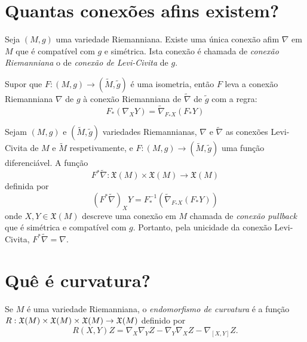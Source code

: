 \section{Quantas conexões afins existem?}

\begin{teorema}
	Seja $(M,g)$ uma variedade Riemanniana. Existe uma única conexão afim $\nabla$ em $M$ que é compatível com $g$ e simétrica.
	Ista conexão é chamada de \emph{conexão Riemanniana} o de \emph{conexão de Levi-Civita} de $g$.
\end{teorema}

\begin{proposicao}
	Supor que $F: (M,g) \rightarrow (\tilde{M}, \tilde{g})$ é uma isometria, então $F$ leva a conexão Riemanniana $\nabla$ de $g$ à conexão Riemanniana de $\tilde{\nabla}$ de $\tilde{g}$ com a regra:
	\begin{equation*}
		F_* (\nabla_X Y) = \tilde{\nabla}_{F_* X} (F_* Y)
	\end{equation*}
\end{proposicao}

\begin{observacao}
	Sejam $(M,g)$ e $(\tilde{M}, \tilde{g})$ variedades Riemannianas, $\nabla$ e $\tilde{\nabla}$ as conexões Levi-Civita de $M$ e $\tilde{M}$ respetivamente, e $F: (M,g) \rightarrow (\tilde{M},\tilde{g})$ uma função diferenciável. A função
	\begin{equation*}
		F^* \tilde{\nabla}: \mathfrak{X}(M) \times \mathfrak{X}(M) \rightarrow \mathfrak{X}(M)
	\end{equation*}
	definida por
	\begin{equation*}
		\left( F^* \tilde{\nabla} \right)_X Y = F^{-1}_* \left( \tilde{\nabla}_{F_* X} (F_* Y) \right)
	\end{equation*}
	onde $X,Y \in \mathfrak{X}(M)$ descreve uma conexão em $M$ chamada de \emph{conexão pullback} que é simétrica e compatível com $g$. Portanto, pela unicidade da conexão Levi-Civita, $F^* \tilde{\nabla} = \nabla$.
\end{observacao}

\section{Quê é curvatura?}

\begin{definicao}
	Se $M$ é uma variedade Riemanniana, o \emph{endomorfismo de curvatura} é a função $R: \mathfrak{X}(M) \times \mathfrak{X}(M) \times \mathfrak{X}(M) \rightarrow \mathfrak{X}(M) $ definido por
	\begin{equation*}
		R(X,Y)Z = \nabla_X \nabla_Y Z - \nabla_Y \nabla_X Z - \nabla_{[X,Y]}Z.
	\end{equation*}
\end{definicao}

